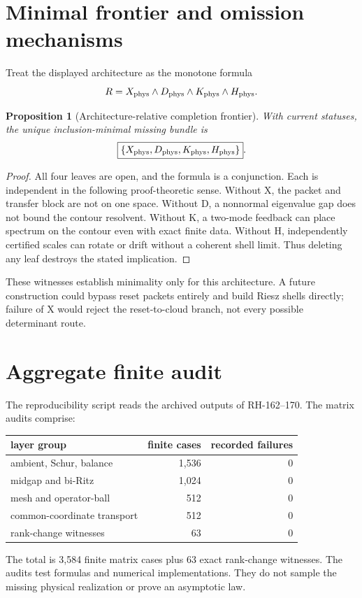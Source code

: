 \documentclass[12pt]{article}
\newtheorem{proposition}[theorem]{Proposition}
\begin{document}
\section{Minimal frontier and omission mechanisms}
Treat the displayed architecture as the monotone formula
\[
 R=X_{\rm phys}\wedge D_{\rm phys}\wedge
 K_{\rm phys}\wedge H_{\rm phys}.
\]

\begin{proposition}[Architecture-relative completion frontier]
With current statuses, the unique inclusion-minimal missing bundle is
\[
 \boxed{\{X_{\rm phys},D_{\rm phys},K_{\rm phys},H_{\rm phys}\}}.
\]
\end{proposition}
\begin{proof}
All four leaves are open, and the formula is a conjunction.  Each is
independent in the following proof-theoretic sense.  Without X, the packet
and transfer block are not on one space.  Without D, a nonnormal eigenvalue
gap does not bound the contour resolvent.  Without K, a two-mode feedback
can place spectrum on the contour even with exact finite data.  Without H,
independently certified scales can rotate or drift without a coherent shell
limit.  Thus deleting any leaf destroys the stated implication.
\end{proof}

These witnesses establish minimality only for this architecture.  A future
construction could bypass reset packets entirely and build Riesz shells
directly; failure of X would reject the reset-to-cloud branch, not every
possible determinant route.

\section{Aggregate finite audit}
The reproducibility script reads the archived outputs of RH-162--170.  The
matrix audits comprise:
\begin{center}
\begin{tabular}{lrr}
\toprule
layer group & finite cases & recorded failures\\
\midrule
ambient, Schur, balance & 1,536 & 0\\
midgap and bi-Ritz & 1,024 & 0\\
mesh and operator-ball & 512 & 0\\
common-coordinate transport & 512 & 0\\
rank-change witnesses & 63 & 0\\
\bottomrule
\end{tabular}
\end{center}
The total is 3,584 finite matrix cases plus 63 exact rank-change witnesses.
The audits test formulas and numerical implementations.  They do not sample
the missing physical realization or prove an asymptotic law.
\end{document}
